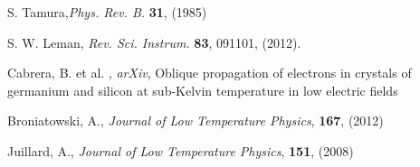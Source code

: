 \documentclass[preprint,12pt]{elsarticle}
\begin{document}
\begin{thebibliography}{99}
S. Tamura,{\it Phys. Rev. B.} \textbf{31}, (1985)

S. W. Leman, {\it Rev. Sci. Instrum.} \textbf{83}, 091101, (2012).

Cabrera, B. et al. , {\it arXiv},  Oblique propagation of electrons in crystals of germanium and silicon at sub-Kelvin temperature in low electric fields

Broniatowski, A., {\it Journal of Low Temperature Physics}, \textbf{167}, (2012)

Juillard, A., {\it Journal of Low Temperature Physics}, \textbf{151}, (2008) 



\end{thebibliography}






\end{document}
